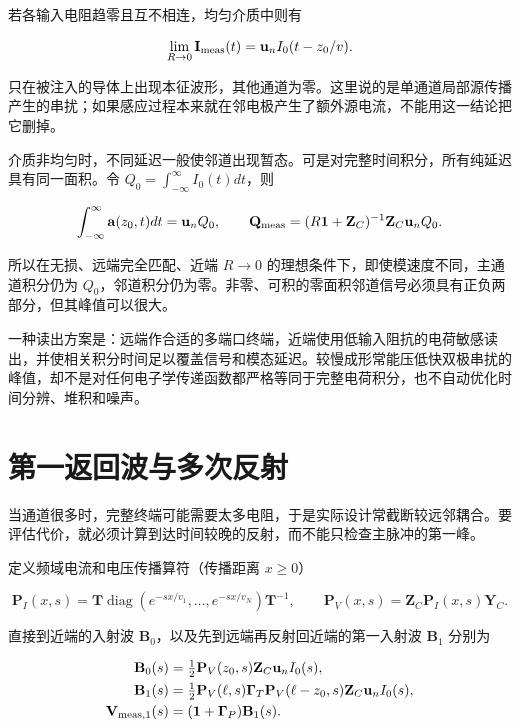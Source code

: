 \documentclass[
  11pt,
  a4paper,
  oneside,
  openany]{report}
\numberwithin{equation}{chapter}
\begin{document}
若各输入电阻趋零且互不相连，均匀介质中则有

\nopagebreak[3]
\begin{equation}
\lim_{R\to0}\mathbf I_{\rm meas}(t)=\mathbf u_nI_0(t-z_0/v).
\end{equation}

只在被注入的导体上出现本征波形，其他通道为零。这里说的是单通道局部源传播产生的串扰；如果感应过程本来就在邻电极产生了额外源电流，不能用这一结论把它删掉。

介质非均匀时，不同延迟一般使邻道出现暂态。可是对完整时间积分，所有纯延迟具有同一面积。令
\(Q_0=\int_{-\infty}^{\infty}I_0(t)dt\)，则

\nopagebreak[3]
\begin{equation}
\int_{-\infty}^{\infty}\mathbf a(z_0,t)dt=\mathbf u_nQ_0,
\qquad
\mathbf Q_{\rm meas}=(R\mathbf1+\mathbf Z_C)^{-1}\mathbf Z_C\mathbf u_nQ_0.
\end{equation}

所以在无损、远端完全匹配、近端 \(R\to0\)
的理想条件下，即使模速度不同，主通道积分仍为
\(Q_0\)，邻道积分仍为零。非零、可积的零面积邻道信号必须具有正负两部分，但其峰值可以很大。

一种读出方案是：远端作合适的多端口终端，近端使用低输入阻抗的电荷敏感读出，并使相关积分时间足以覆盖信号和模态延迟。较慢成形常能压低快双极串扰的峰值，却不是对任何电子学传递函数都严格等同于完整电荷积分，也不自动优化时间分辨、堆积和噪声。

\section{第一返回波与多次反射}\label{sec-return-waves}

当通道很多时，完整终端可能需要太多电阻，于是实际设计常截断较远邻耦合。要评估代价，就必须计算到达时间较晚的反射，而不能只检查主脉冲的第一峰。

定义频域电流和电压传播算符（传播距离 \(x\ge0\)）

\nopagebreak[3]
\begin{equation}
\mathbf P_I(x,s)=\mathbf T\operatorname{diag}(e^{-sx/v_1},\ldots,e^{-sx/v_N})\mathbf T^{-1},
\qquad
\mathbf P_V(x,s)=\mathbf Z_C\mathbf P_I(x,s)\mathbf Y_C.
\end{equation}

直接到近端的入射波 \(\mathbf B_0\)，以及先到远端再反射回近端的第一入射波
\(\mathbf B_1\) 分别为

\nopagebreak[3]
\begin{equation}
\begin{aligned}
\mathbf B_0(s)&=\tfrac12\mathbf P_V(z_0,s)\mathbf Z_C\mathbf u_nI_0(s),\\
\mathbf B_1(s)&=\tfrac12\mathbf P_V(\ell,s)\boldsymbol\Gamma_T
\mathbf P_V(\ell-z_0,s)\mathbf Z_C\mathbf u_nI_0(s),\\
\mathbf V_{{\rm meas},1}(s)&=(\mathbf1+\boldsymbol\Gamma_P)\mathbf B_1(s).
\end{aligned}
\end{equation}
\end{document}
